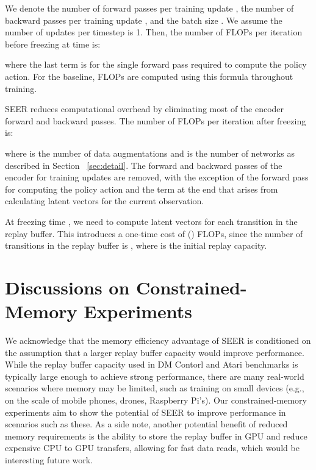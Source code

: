 \documentclass{article}
\begin{document}
We denote the number of forward passes per training update , the number of backward passes per training update , and the batch size . We assume the number of updates per timestep is 1. Then, the number of FLOPs per iteration before freezing at time  is:
\begin{center}
    
\end{center}
where the last term is for the single forward pass required to compute the policy action. For the baseline, FLOPs are computed using this formula throughout training.

SEER reduces computational overhead by eliminating most of the encoder forward and backward passes. The number of FLOPs per iteration after freezing is:
\begin{center}
    
\end{center}
where  is the number of data augmentations and  is the number of networks as described in Section ~\ref{sec:detail}. The forward and backward passes of the encoder for training updates are removed, with the exception of the forward pass for computing the policy action and the  term at the end that arises from calculating latent vectors for the current observation.

At freezing time , we need to compute latent vectors for each transition in the replay buffer. This introduces a one-time cost of () FLOPs, since the number of transitions in the replay buffer is , where  is the initial replay capacity. 

\section{Discussions on Constrained-Memory Experiments} \label{appendix:memory_assumptions}

We acknowledge that the memory efficiency advantage of SEER is conditioned on the assumption that a larger replay buffer capacity would improve performance. While the replay buffer capacity used in DM Contorl and Atari benchmarks is typically large enough to achieve strong performance, there are many real-world scenarios where memory may be limited, such as training on small devices (e.g., on the scale of mobile phones, drones, Raspberry Pi's). Our constrained-memory experiments aim to show the potential of SEER to improve performance in scenarios such as these. As a side note, another potential benefit of reduced memory requirements is the ability to store the replay buffer in GPU and reduce expensive CPU to GPU transfers, allowing for fast data reads, which would be interesting future work.
\end{document}
